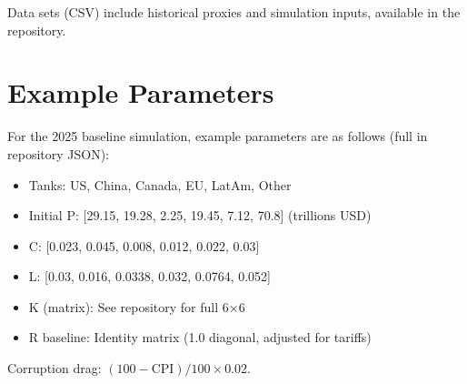 \documentclass[11pt]{article}
\begin{document}
Data sets (CSV) include historical proxies and simulation inputs, available in the repository. 

\section{Example Parameters}
For the 2025 baseline simulation, example parameters are as follows (full in repository JSON):

\begin{itemize}
\item Tanks: US, China, Canada, EU, LatAm, Other
\item Initial P: [29.15, 19.28, 2.25, 19.45, 7.12, 70.8] (trillions USD)
\item C: [0.023, 0.045, 0.008, 0.012, 0.022, 0.03]
\item L: [0.03, 0.016, 0.0338, 0.032, 0.0764, 0.052]
\item K (matrix): See repository for full 6$\times$6
\item R baseline: Identity matrix (1.0 diagonal, adjusted for tariffs)
\end{itemize}

Corruption drag: $(100 - \text{CPI}) / 100 \times 0.02$.
\end{document}
